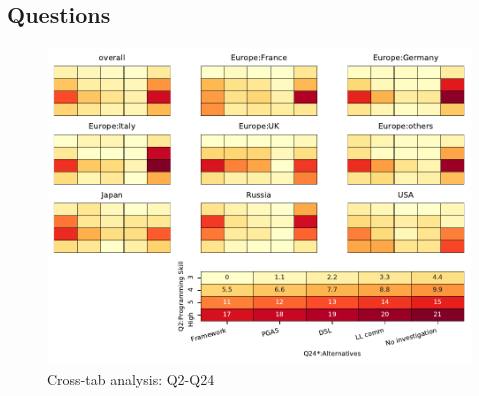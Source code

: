 
\subsection{Questions}


\begin{figure}
\begin{center}
\includegraphics[width=12cm]{../pdfs/Q2-Q24.pdf}
\caption{Cross-tab analysis: Q2-Q24}
\label{fig:Q2-Q24}
\end{center}
\end{figure}
